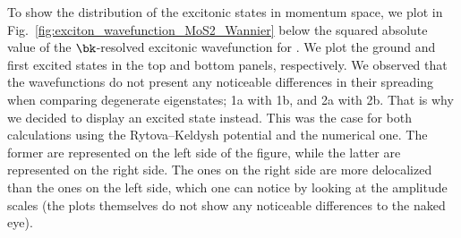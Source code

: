 
To show the distribution of the excitonic states in momentum space, we plot in Fig.~\ref{fig:exciton_wavefunction_MoS2_Wannier} below the squared absolute value of the $\bk$-resolved excitonic wavefunction for .
We plot the ground and first excited states in the top and bottom panels, respectively.
We observed that the wavefunctions do not present any noticeable differences in their spreading when comparing degenerate eigenstates; 1a with 1b, and 2a with 2b.
That is why we decided to display an excited state instead.
This was the case for both calculations using the Rytova--Keldysh potential and the numerical one.
The former are represented on the left side of the figure, while the latter are represented on the right side.
The ones on the right side are more delocalized than the ones on the left side, which one can notice by looking at the amplitude scales (the plots themselves do not show any noticeable differences to the naked eye).

